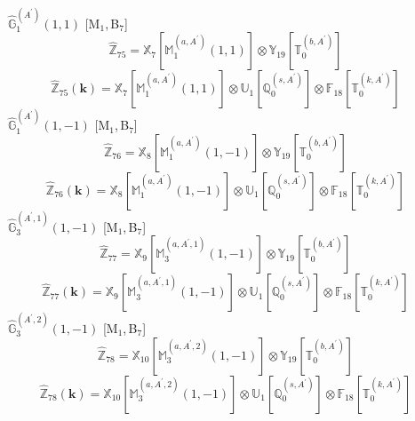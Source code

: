\documentclass[fleqn,10pt,landscape]{article}
\begin{document}
\begin{itemize}
\noindent {} $\,\,\,\hat{\mathbb{G}}_{1}^{(A^{\prime})}(1,1)$ [M$_{1}$,\,B$_{7}$]
\begin{dmath*}
\hat{\mathbb{Z}}_{75}=\mathbb{X}_{7}[\mathbb{M}_{1}^{(a,A^{\prime})}(1,1)] \otimes\mathbb{Y}_{19}[\mathbb{T}_{0}^{(b,A^{\prime})}]
\end{dmath*}
\begin{dmath*}
\hat{\mathbb{Z}}_{75}(\bm{k})=\mathbb{X}_{7}[\mathbb{M}_{1}^{(a,A^{\prime})}(1,1)] \otimes\mathbb{U}_{1}[\mathbb{Q}_{0}^{(s,A^{\prime})}] \otimes\mathbb{F}_{18}[\mathbb{T}_{0}^{(k,A^{\prime})}]
\end{dmath*}
\vspace{4mm}
\noindent {} $\,\,\,\hat{\mathbb{G}}_{1}^{(A^{\prime})}(1,-1)$ [M$_{1}$,\,B$_{7}$]
\begin{dmath*}
\hat{\mathbb{Z}}_{76}=\mathbb{X}_{8}[\mathbb{M}_{1}^{(a,A^{\prime})}(1,-1)] \otimes\mathbb{Y}_{19}[\mathbb{T}_{0}^{(b,A^{\prime})}]
\end{dmath*}
\begin{dmath*}
\hat{\mathbb{Z}}_{76}(\bm{k})=\mathbb{X}_{8}[\mathbb{M}_{1}^{(a,A^{\prime})}(1,-1)] \otimes\mathbb{U}_{1}[\mathbb{Q}_{0}^{(s,A^{\prime})}] \otimes\mathbb{F}_{18}[\mathbb{T}_{0}^{(k,A^{\prime})}]
\end{dmath*}
\vspace{4mm}
\noindent {} $\,\,\,\hat{\mathbb{G}}_{3}^{(A^{\prime},1)}(1,-1)$ [M$_{1}$,\,B$_{7}$]
\begin{dmath*}
\hat{\mathbb{Z}}_{77}=\mathbb{X}_{9}[\mathbb{M}_{3}^{(a,A^{\prime},1)}(1,-1)] \otimes\mathbb{Y}_{19}[\mathbb{T}_{0}^{(b,A^{\prime})}]
\end{dmath*}
\begin{dmath*}
\hat{\mathbb{Z}}_{77}(\bm{k})=\mathbb{X}_{9}[\mathbb{M}_{3}^{(a,A^{\prime},1)}(1,-1)] \otimes\mathbb{U}_{1}[\mathbb{Q}_{0}^{(s,A^{\prime})}] \otimes\mathbb{F}_{18}[\mathbb{T}_{0}^{(k,A^{\prime})}]
\end{dmath*}
\vspace{4mm}
\noindent {} $\,\,\,\hat{\mathbb{G}}_{3}^{(A^{\prime},2)}(1,-1)$ [M$_{1}$,\,B$_{7}$]
\begin{dmath*}
\hat{\mathbb{Z}}_{78}=\mathbb{X}_{10}[\mathbb{M}_{3}^{(a,A^{\prime},2)}(1,-1)] \otimes\mathbb{Y}_{19}[\mathbb{T}_{0}^{(b,A^{\prime})}]
\end{dmath*}
\begin{dmath*}
\hat{\mathbb{Z}}_{78}(\bm{k})=\mathbb{X}_{10}[\mathbb{M}_{3}^{(a,A^{\prime},2)}(1,-1)] \otimes\mathbb{U}_{1}[\mathbb{Q}_{0}^{(s,A^{\prime})}] \otimes\mathbb{F}_{18}[\mathbb{T}_{0}^{(k,A^{\prime})}]

\end{dmath*}
\end{itemize}
\end{document}
